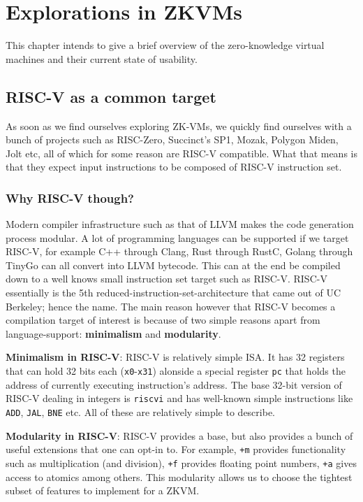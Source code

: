 
\chapter{Explorations in ZKVMs}

This chapter intends to give a brief overview of the zero-knowledge virtual machines and their current state of usability.

\section{RISC-V as a common target}
As soon as we find ourselves exploring ZK-VMs, we quickly find ourselves with a bunch of projects such as RISC-Zero, Succinct's SP1, Mozak, Polygon Miden, Jolt etc, all of which for some reason are RISC-V compatible. What that means is that they expect input instructions to be composed of RISC-V instruction set.

\subsection{Why RISC-V though?}
Modern compiler infrastructure such as that of LLVM makes the code generation process modular. A lot of programming languages can be supported if we target RISC-V, for example C++ through Clang, Rust through RustC, Golang through TinyGo can all convert into LLVM bytecode. This can at the end be compiled down to a well knows small instruction set target such as RISC-V. RISC-V essentially is the 5th reduced-instruction-set-architecture that came out of UC Berkeley; hence the name. The main reason however that RISC-V becomes a compilation target of interest is because of two simple reasons apart from language-support: \textbf{minimalism} and \textbf{modularity}.


\textbf{Minimalism in RISC-V}: RISC-V is relatively simple ISA. It has 32 registers that can hold 32 bits each (\texttt{x0}-\texttt{x31}) alonside a special register \texttt{pc} that holds the address of currently executing instruction's address. The base 32-bit version of RISC-V dealing in integers is \texttt{riscvi} and has well-known simple instructions like \texttt{ADD}, \texttt{JAL}, \texttt{BNE} etc. All of these are relatively simple to describe.


\textbf{Modularity in RISC-V}: RISC-V provides a base, but also provides a bunch of useful extensions that one can opt-in to. For example, \texttt{+m} provides functionality such as multiplication (and division), \texttt{+f} provides floating point numbers, \texttt{+a} gives access to atomics among others. This modularity allows us to choose the tightest subset of features to implement for a ZKVM.

